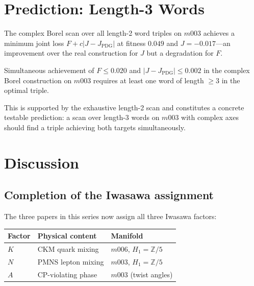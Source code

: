 ﻿\documentclass[epjc3]{svjour3}
\begin{document}
\section{Prediction: Length-3 Words}
\label{sec:length3}

The complex Borel scan over all length-2 word triples on $m003$
achieves a minimum joint loss $F + c|J - J_{\mathrm{PDG}}|$ at
fitness $0.049$ and $J = -0.017$---an improvement over the real
construction for $J$ but a degradation for $F$.

\begin{proposition}
\label{prop:length3}
Simultaneous achievement of $F \leq 0.020$ and
$|J - J_{\mathrm{PDG}}| \leq 0.002$ in the complex Borel
construction on $m003$ requires at least one word of length $\geq 3$
in the optimal triple.
\end{proposition}

This is supported by the exhaustive length-2 scan and constitutes a
concrete testable prediction: a scan over length-3 words on $m003$
with complex axes should find a triple achieving both targets
simultaneously.

\section{Discussion}
\label{sec:discussion}

\subsection{Completion of the Iwasawa assignment}
\label{subsec:completion}

The three papers in this series now assign all three Iwasawa factors:

\begin{center}
\begin{tabular}{lll}
\toprule
Factor & Physical content & Manifold \\
\midrule
$K$ & CKM quark mixing   & $m006$, $H_1 = \mathbb{Z}/5$ \\
$N$ & PMNS lepton mixing  & $m003$, $H_1 = \mathbb{Z}/5$ \\
$A$ & CP-violating phase  & $m003$ (twist angles) \\
\bottomrule
\end{tabular}
\end{center}
\end{document}
